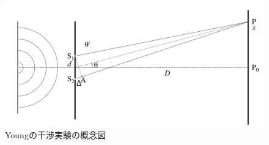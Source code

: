 \begin{figure}[htbp]
	\centering
	\includegraphics[width=\linewidth]{src/figures/principle/young_interference.png}
	\caption{Youngの干渉実験の概念図}\label{fig:young_interference}
\end{figure}
